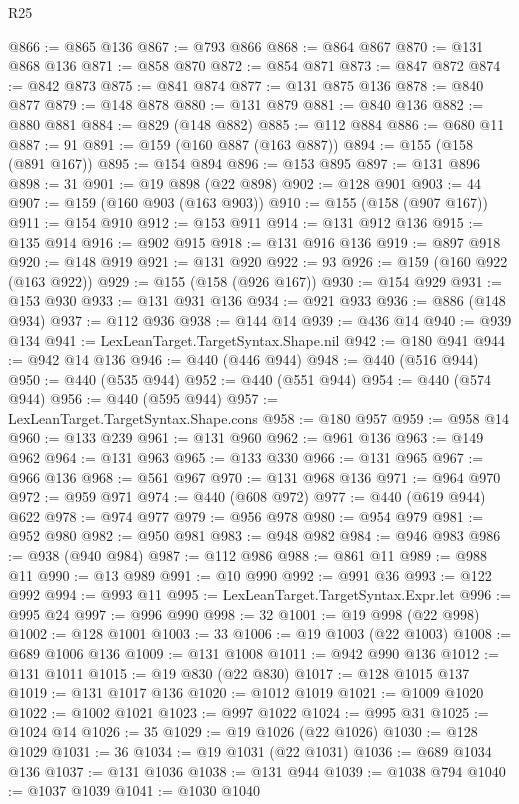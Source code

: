 \begin{lexlean}{R25}
\begin{coremodule}
{{{{{{{{{{{{{{{{{{{{{{{{{{{{{{{{{{{{{{{{{{{{{{{{{{{{{{{{{{{{{{{{{{{{{{{{{{{{{{{{{{{{{{{{{{{{{{{{{{{{{{{{{{{{{{{{{{{{{{{{{{{{{{{{{{{{{{{{{{{{{{{{{{{{{{{{{{{{{{{{{{{{{{{{{{{{{{{{{{{{{{{{{{{{{{{{{{{{{{{@866 := @865 @136
@867 := @793 @866
@868 := @864 @867
@870 := @131 @868 @136
@871 := @858 @870
@872 := @854 @871
@873 := @847 @872
@874 := @842 @873
@875 := @841 @874
@877 := @131 @875 @136
@878 := @840 @877
@879 := @148 @878
@880 := @131 @879
@881 := @840 @136
@882 := @880 @881
@884 := @829 (@148 @882)
@885 := @112 @884
@886 := @680 @11
@887 := 91
@891 := @159 (@160 @887 (@163 @887))
@894 := @155 (@158 (@891 @167))
@895 := @154 @894
@896 := @153 @895
@897 := @131 @896
@898 := 31
@901 := @19 @898 (@22 @898)
@902 := @128 @901
@903 := 44
@907 := @159 (@160 @903 (@163 @903))
@910 := @155 (@158 (@907 @167))
@911 := @154 @910
@912 := @153 @911
@914 := @131 @912 @136
@915 := @135 @914
@916 := @902 @915
@918 := @131 @916 @136
@919 := @897 @918
@920 := @148 @919
@921 := @131 @920
@922 := 93
@926 := @159 (@160 @922 (@163 @922))
@929 := @155 (@158 (@926 @167))
@930 := @154 @929
@931 := @153 @930
@933 := @131 @931 @136
@934 := @921 @933
@936 := @886 (@148 @934)
@937 := @112 @936
@938 := @144 @14
@939 := @436 @14
@940 := @939 @134
@941 := LexLeanTarget.TargetSyntax.Shape.nil
@942 := @180 @941
@944 := @942 @14 @136
@946 := @440 (@446 @944)
@948 := @440 (@516 @944)
@950 := @440 (@535 @944)
@952 := @440 (@551 @944)
@954 := @440 (@574 @944)
@956 := @440 (@595 @944)
@957 := LexLeanTarget.TargetSyntax.Shape.cons
@958 := @180 @957
@959 := @958 @14
@960 := @133 @239
@961 := @131 @960
@962 := @961 @136
@963 := @149 @962
@964 := @131 @963
@965 := @133 @330
@966 := @131 @965
@967 := @966 @136
@968 := @561 @967
@970 := @131 @968 @136
@971 := @964 @970
@972 := @959 @971
@974 := @440 (@608 @972)
@977 := @440 (@619 @944) @622
@978 := @974 @977
@979 := @956 @978
@980 := @954 @979
@981 := @952 @980
@982 := @950 @981
@983 := @948 @982
@984 := @946 @983
@986 := @938 (@940 @984)
@987 := @112 @986
@988 := @861 @11
@989 := @988 @11
@990 := @13 @989
@991 := @10 @990
@992 := @991 @36
@993 := @122 @992
@994 := @993 @11
@995 := LexLeanTarget.TargetSyntax.Expr.let
@996 := @995 @24
@997 := @996 @990
@998 := 32
@1001 := @19 @998 (@22 @998)
@1002 := @128 @1001
@1003 := 33
@1006 := @19 @1003 (@22 @1003)
@1008 := @689 @1006 @136
@1009 := @131 @1008
@1011 := @942 @990 @136
@1012 := @131 @1011
@1015 := @19 @830 (@22 @830)
@1017 := @128 @1015 @137
@1019 := @131 @1017 @136
@1020 := @1012 @1019
@1021 := @1009 @1020
@1022 := @1002 @1021
@1023 := @997 @1022
@1024 := @995 @31
@1025 := @1024 @14
@1026 := 35
@1029 := @19 @1026 (@22 @1026)
@1030 := @128 @1029
@1031 := 36
@1034 := @19 @1031 (@22 @1031)
@1036 := @689 @1034 @136
@1037 := @131 @1036
@1038 := @131 @944
@1039 := @1038 @794
@1040 := @1037 @1039
@1041 := @1030 @1040
}}}}}}}}}}}}}}}}}}}}}}}}}}}}}}}}}}}}}}}}}}}}}}}}}}}}}}}}}}}}}}}}}}}}}}}}}}}}}}}}}}}}}}}}}}}}}}}}}}}}}}}}}}}}}}}}}}}}}}}}}}}}}}}}}}}}}}}}}}}}}}}}}}}}}}}}}}}}}}}}}}}}}}}}}}}}}}}}}}}}}}}}}}}}}}}}}}}}}}}
\end{coremodule}
\end{lexlean}
